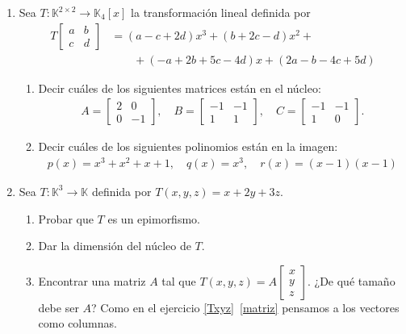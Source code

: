 \begin{enumerate}[topsep=6pt, itemsep=.4cm]
    \rta

        \item Sea $T:\mathbb{K}^{2\times 2}\longrightarrow\mathbb{K}_{4}[x]$ la transformación lineal definida por
        \begin{align*}
        T   \begin{bmatrix}  a&b\\c&d \end{bmatrix} &= (a-c+2d)x^3+(b+2c-d)x^2+ \\
        &\qquad+(-a+2b+5c-4d)x+(2a-b-4c+5d)
        \end{align*}
        \begin{enumerate}
            \item\label{tl-matrices-pol-a} Decir cuáles de los siguientes matrices están en el núcleo:
                \begin{align*}
                    A=\begin{bmatrix}
                        2&0\\0&-1
                    \end{bmatrix},
                \quad
                B=\begin{bmatrix}
                    -1&-1\\1&1
                \end{bmatrix},
                \quad
                C=\begin{bmatrix}
                    -1&-1\\1&0
                \end{bmatrix}.
                \end{align*}
            \item\label{tl-matrices-pol-b} Decir cuáles de los siguientes polinomios están en la imagen:
                \begin{align*}
                    p(x)=x^3+x^2+x+1,\quad q(x)=x^3, \quad r(x)=(x-1)(x-1) 
                \end{align*}
        \end{enumerate}
    
    \rta
    
    \item\label{funcional ej}  Sea $T:\mathbb{K}^3\longrightarrow\mathbb{K}$ definida por $T(x,y,z)=x+2y+3z$.
    \begin{enumerate}
        \item\label{funcional ej a} Probar que $T$ es un epimorfismo.
        \item\label{funcional ej b} Dar la dimensión del núcleo de $T$.
        \item\label{funcional ej c} Encontrar una matriz $A$ tal que
            $T(x,y,z)=A\begin{bmatrix}
            x\\y\\z \end{bmatrix}$. ¿De qué tamaño debe ser $A$? Como en el ejercicio \ref{Txyz}\, \ref{matriz} pensamos a los vectores como columnas. 
    \end{enumerate}


\end{enumerate}
